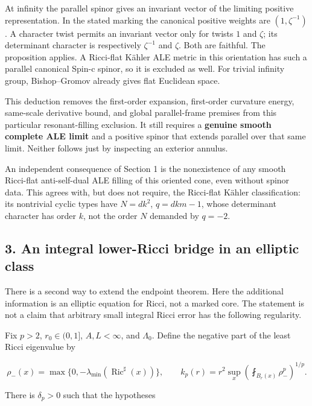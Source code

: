 \documentclass[
  10pt,
]{article}
\begin{document}
At infinity the parallel spinor gives an invariant vector of the
limiting positive representation. In the stated marking the canonical
positive weights are \((1,\zeta^{-1})\). A character twist permits an
invariant vector only for twists \(1\) and \(\zeta\); its determinant
character is respectively \(\zeta^{-1}\) and \(\zeta\). Both are
faithful. The proposition applies. A Ricci-flat Kähler ALE metric in
this orientation has such a parallel canonical Spin-c spinor, so it is
excluded as well. For trivial infinity group, Bishop--Gromov already
gives flat Euclidean space.

This deduction removes the first-order expansion, first-order curvature
energy, same-scale derivative bound, and global parallel-frame premises
from this particular resonant-filling exclusion. It still requires a
\textbf{genuine smooth complete ALE limit} and a positive spinor that
extends parallel over that same limit. Neither follows just by
inspecting an exterior annulus.

An independent consequence of Section 1 is the nonexistence of any
smooth Ricci-flat anti-self-dual ALE filling of this oriented cone, even
without spinor data. This agrees with, but does not require, the
Ricci-flat Kähler classification: its nontrivial cyclic types have
\(N=dk^2\), \(q=dkm-1\), whose determinant character has order \(k\),
not the order \(N\) demanded by \(q=-2\).

\hypertarget{an-integral-lower-ricci-bridge-in-an-elliptic-class}{%
\subsection{3. An integral lower-Ricci bridge in an elliptic
class}\label{an-integral-lower-ricci-bridge-in-an-elliptic-class}}

There is a second way to extend the endpoint theorem. Here the
additional information is an elliptic equation for Ricci, not a marked
core. The statement is not a claim that arbitrary small integral Ricci
error has the following regularity.

Fix \(p>2\), \(r_0\in(0,1]\), \(A,L<\infty\), and \(\Lambda_0\). Define
the negative part of the least Ricci eigenvalue by

\[
 \rho_-(x)=\max\{0,-\lambda_{\min}(\operatorname{Ric}^{\sharp}(x))\},
 \qquad k_p(r)=r^2\sup_x
                  \left(\fint_{B_r(x)}\rho_-^p\right)^{1/p}.
                                                        \tag{3.1}
\]

There is \(\delta_p>0\) such that the hypotheses
\end{document}
